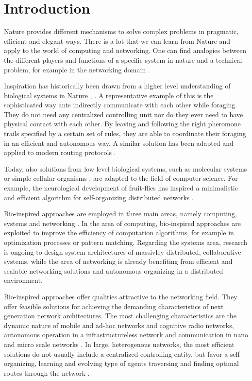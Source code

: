 \documentclass[cameraready]{IWORK2014}
\begin{document}


\section{Introduction}

Nature provides different mechanisms to solve complex problems in pragmatic, efficient and elegant ways. There is a lot that we can learn from Nature and apply to the world of computing and networking. One can find analogies between the different players and functions of a specific system in nature and a technical problem, for example in the networking domain \cite{dressler2010bio}.

Inspiration has historically been drawn from a higher level understanding of biological systems in Nature \cite{kroeker2011biology}, \cite{liu2012physarum}. A representative example of this is the sophisticated way ants indirectly communicate with each other while foraging. They do not need any centralized controlling unit nor do they ever need to have physical contact with each other. By leaving and following the right pheromone trails specified by a certain set of rules, they are able to coordinate their foraging in an efficient and autonomous way. A similar solution has been adapted and applied to modern routing protocols \cite{dressler2010bio}.

Today, also solutions from low level biological systems, such as molecular systems \cite{kroeker2011biology} or simple cellular organisms \cite{liu2012physarum}, are adapted to the field of computer science. For example, the neurological development of fruit-flies has inspired a minimalistic and efficient algorithm for self-organizing distributed networks \cite{kroeker2011biology}.

Bio-inspired approaches are employed in three main areas, namely computing, systems and networking \cite{dressler2010bio}. In the area of computing, bio-inspired approaches are exploited to improve the efficiency of computation algorithms, for example in optimization processes or pattern matching. Regarding the systems area, research is ongoing to design system architectures of massivley distributed, collaborative systems, while the area of networking is already benefiting from efficient and scalable networking solutions and autonomous organizing in a distributed environment.

Bio-inspired approaches offer qualities attractive to the networking field. They offer feasible solutions for achieving the demanding characteristics of next generation network architectures. The most challenging characteristics are the dynamic nature of mobile and ad-hoc networks and cognitive radio networks, autonomous operation in a infrastructureless network and communication in nano and micro scale networks \cite{dressler2010bio}. In large, heterogenous networks, the most efficient solutions do not usually include a centralized controlling entity, but favor a self-organizing, learning and evolving type of agents traversing and finding optimal routes through the network \cite{dressler2010bio}.
\end{document}
